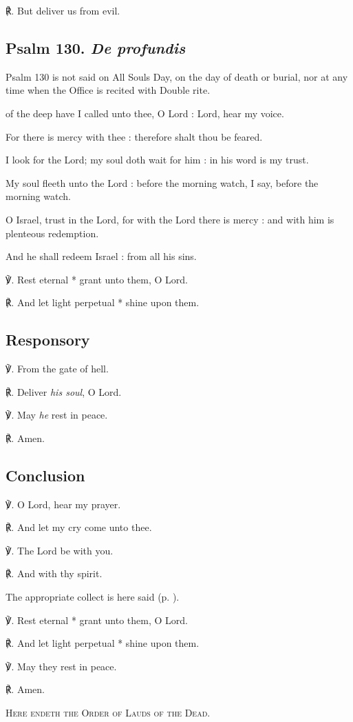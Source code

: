 ℟. But deliver us from evil.

\subsection{Psalm 130. \textit{De profundis}}
\begin{rubric}
{Psalm 130 is not said on All Souls Day, on the day of death or burial, nor at any time when the Office is recited with Double rite.}
\end{rubric}
 of the deep have I called unto thee, O Lord : Lord, hear my voice.\par
{}
For there is mercy with thee : therefore shalt thou be feared.\par
{}I look for the Lord; my soul doth wait for him : in his word is my trust.\par
{}My soul fleeth unto the Lord : before the morning watch, I say, before the morning watch.\par
{}O Israel, trust in the Lord, for with the Lord there is mercy : and with him is plenteous redemption.\par
{}And he shall redeem Israel : from all his sins.\par
℣. Rest eternal * grant unto them, O Lord.\par
℟. And let light perpetual * shine upon them.

\subsection{Responsory}
℣. From the gate of hell.

℟. Deliver \textit{his soul}, O Lord.

℣. May \textit{he} rest in peace.

℟. Amen.

\subsection{Conclusion}
℣. O Lord, hear my prayer.

℟. And let my cry come unto thee.

℣. The Lord be with you.

℟. And with thy spirit.

\begin{rubric}
{The appropriate collect is here said (p. \pageref{dead}).}
\end{rubric}

℣. Rest eternal * grant unto them, O Lord.

℟. And let light perpetual * shine upon them.

℣. May they rest in peace.

℟. Amen.

\begin{center}
    \textsc{Here endeth the Order of Lauds of the Dead.}
\end{center}